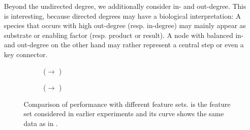 \documentclass[
	fontsize=10pt, %
	twoside=false, %
	secnumdepth=1, %
  toc=indentunnumbered %
]{kaobook}
\begin{document}
Beyond the undirected degree, we additionally consider in- and out-degree. This
is interesting, because directed degrees may have a biological interpretation: A
species that occurs with high out-degree (resp. in-degree) may mainly appear as
substrate or enabling factor (resp. product or result). A node with balanced in-
and out-degree on the other hand may rather represent a central step or even a
key connector.


\begin{figure}[h]
  \centering
  \begin{subfigure}{0.48\linewidth}
    \caption{(\ADLast $\rightarrow$ \PDMap)}
  \end{subfigure}
  \begin{subfigure}{0.48\linewidth}
    \caption{(\ADLast $\rightarrow$ \ReconMap)}
  \end{subfigure}
  \caption[Comparison of performance with different feature sets.]{Comparison of
    performance with different feature sets.  is the
    feature set considered in earlier experiments and its curve shows the same
    data as in .}
  \label{fig:feature-importance}
\end{figure}
\end{document}
